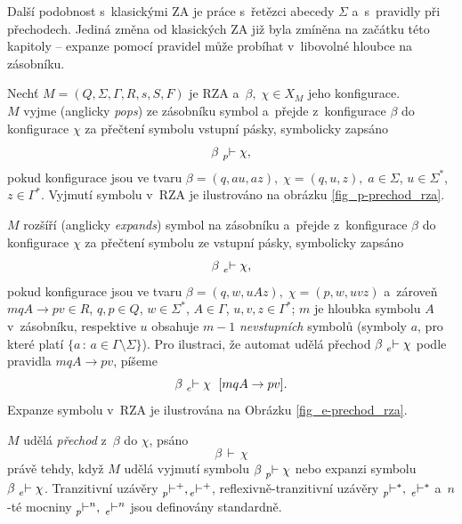 Další podobnost s~klasickými ZA je práce s~řetězci abecedy $\Sigma$ a~s~pravidly při přechodech. 
Jediná změna od klasických ZA již byla zmíněna na začátku této kapitoly -- expanze pomocí pravidel může probíhat v~libovolné hloubce na zásobníku.

\begin{definition}\label{def_prechod_rza}
    Nechť $M = (Q, \Sigma, \Gamma, R, s, S, F)$ je RZA a~$\beta,\; \chi \in X_M$ jeho konfigurace.\\
    $M$ vyjme (anglicky \emph{pops}) ze zásobníku symbol a~přejde z~konfigurace $\beta$ do konfigurace $\chi$ za přečtení symbolu vstupní pásky, symbolicky zapsáno
    \begin{equation*}
        \beta\, \prescript{}{p}{\vdash}\; \chi,
    \end{equation*}
    pokud konfigurace jsou ve tvaru $\beta = (q, au, az),\; \chi = (q, u, z),\; a \in \Sigma$, $u \in \Sigma^*$, ${z \in \Gamma^*}$.
    Vyjmutí symbolu v~RZA je ilustrováno na obrázku \ref{fig_p-prechod_rza}.
   
    $M$ rozšíří (anglicky \emph{expands}) symbol na zásobníku a~přejde z~konfigurace $\beta$ do konfigurace $\chi$ za přečtení symbolu ze vstupní pásky, symbolicky zapsáno
    \begin{equation*}
        \beta\, \prescript{}{e}{\vdash}\; \chi,
    \end{equation*} 
    pokud konfigurace jsou ve tvaru $\beta = (q, w, uAz),\; \chi = (p, w, uvz)$ a~zároveň $mqA \rightarrow pv \in R$, $q, p \in Q$, $w \in \Sigma^*$, $A \in \Gamma$, $u, v, z \in \Gamma^*$; $m$ je hloubka symbolu $A$ v~zásobníku, respektive $u$ obsahuje $m-1$ \emph{nevstupních} symbolů (symboly $a$, pro které platí $\{a\, :\, a \in \Gamma \setminus \Sigma\}$). 
    Pro ilustraci, že automat udělá přechod $\beta\, \prescript{}{e}{\vdash}\; \chi$ podle pravidla $mqA \rightarrow pv$, píšeme
     \begin{equation*}
        \beta\, \prescript{}{e}{\vdash}\; \chi \ \; [mqA \rightarrow pv].
    \end{equation*}
    Expanze symbolu v~RZA je ilustrována na Obrázku \ref{fig_e-prechod_rza}.
    
    $M$ udělá \emph{přechod} z~$\beta$ do $\chi$, psáno
    \begin{equation*}
        \beta\, \vdash\, \chi
    \end{equation*}
    právě tehdy, když $M$ udělá vyjmutí symbolu $\beta\, \prescript{}{p}{\vdash}\; \chi$ nebo expanzi symbolu $\beta\, \prescript{}{e}{\vdash}\; \chi$.
    Tranzitivní uzávěry $\prescript{}{p}{\vdash^+}, \prescript{}{e}{\vdash^+}$, reflexivně-tranzitivní uzávěry $\prescript{}{p}{\vdash^*},\; \prescript{}{e}{\vdash^*}$ a~$n$-té mocniny $\prescript{}{p}{\vdash^n},\; \prescript{}{e}{\vdash^n}$ jsou definovány standardně.
\end{definition}


